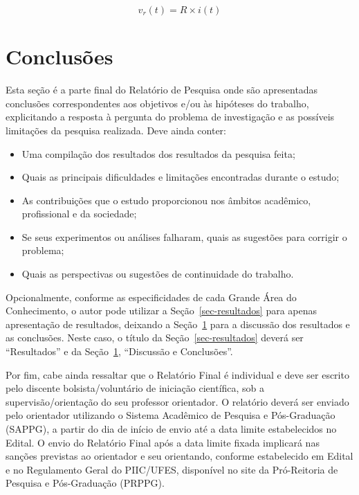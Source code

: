 \documentclass[10pt, a4paper]{article}
\begin{document}
\begin{equation}
	\label{eqn-exemplo}
	v_{r}(t) = R \times i(t)
\end{equation}



\section{Conclusões}
\label{sec-conclusoes}

Esta seção é a parte final do Relatório de Pesquisa onde são apresentadas conclusões correspondentes aos objetivos e/ou às hipóteses do trabalho, explicitando a resposta à pergunta do problema de investigação e as possíveis limitações da pesquisa realizada. Deve ainda conter:

\begin{itemize}
	\item Uma compilação dos resultados dos resultados da pesquisa feita;
	\item Quais as principais dificuldades e limitações encontradas durante o estudo; 
	\item As contribuições que o estudo proporcionou nos âmbitos acadêmico, profissional e da sociedade;
	\item Se seus experimentos ou análises falharam, quais as sugestões para corrigir o problema;
	\item Quais as perspectivas ou sugestões de continuidade do trabalho.
\end{itemize}

Opcionalmente, conforme as especificidades de cada Grande Área do Conhecimento, o autor pode utilizar a Seção~\ref{sec-resultados} para apenas apresentação de resultados, deixando a Seção~\ref{sec-conclusoes} para a discussão dos resultados e as conclusões. Neste caso, o título da Seção~\ref{sec-resultados} deverá ser ``Resultados'' e da Seção~\ref{sec-conclusoes}, ``Discussão e Conclusões''.

Por fim, cabe ainda ressaltar que o Relatório Final é individual e deve ser escrito pelo discente bolsista/voluntário de iniciação científica, sob a supervisão/orientação do seu professor orientador. O relatório deverá ser enviado pelo orientador utilizando o Sistema Acadêmico de Pesquisa e Pós-Graduação (SAPPG), a partir do dia de início de envio até a data limite estabelecidos no Edital. O envio do Relatório Final após a data limite fixada implicará nas sanções previstas ao orientador e seu orientando, conforme estabelecido em Edital e no Regulamento Geral do PIIC/UFES, disponível no site da Pró-Reitoria de Pesquisa e Pós-Graduação (PRPPG).
\end{document}
